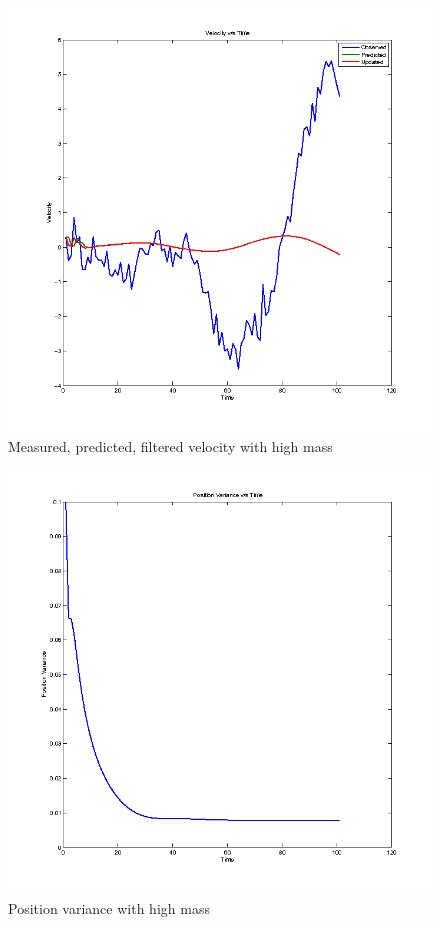 \documentclass[12pt]{article}
\begin{document}
\begin{figure}
    \includegraphics[width=\linewidth]{kalman-velocity-m100}
    \caption{Measured, predicted, filtered velocity with high mass}
\end{figure}

\begin{figure}
    \includegraphics[width=\linewidth]{kalman-variance1-m100}
    \caption{Position variance with high mass}
\end{figure}
\end{document}
